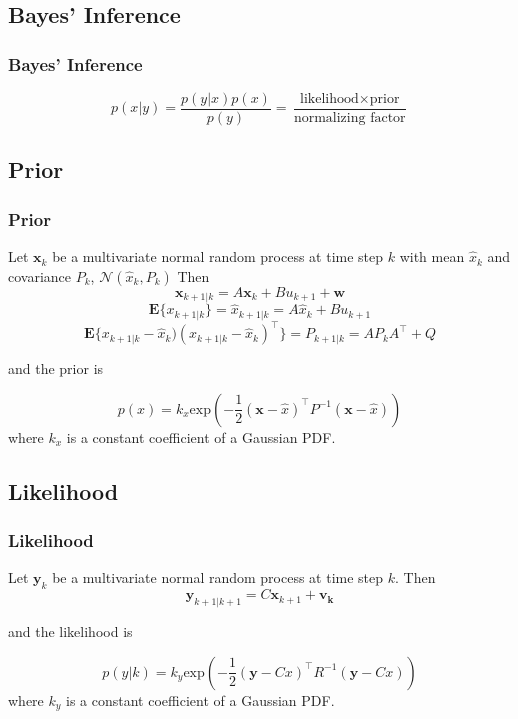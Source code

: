 \documentclass[10pt]{beamer}
\begin{document}

\subsection{Bayes' Inference}

\begin{frame}

  \frametitle{Bayes' Inference}

  $$p(x|y) = \frac{ p(y|x)p(x)}{p(y)} = \frac{\text{likelihood}\times \text{prior}}{\text{normalizing factor}} $$

\end{frame}



\subsection{Prior}

\begin{frame}

  \frametitle{Prior}

  Let $\mathbf{x}_k$ be a multivariate normal random process at time step $k$ with mean $\hat{x}_k$ and covariance $P_k$,  $\mathcal{N}(\hat{x}_k,P_k)$ Then
 $$\mathbf{x}_{k+1|k} = A\mathbf{x}_k + Bu_{k+1} + \mathbf{w}$$ 
 $$\textbf{E}\{x_{k+1|k}\} = \hat{x}_{k+1|k} =  A\hat{x}_k + Bu_{k+1}$$
 $$\textbf{E}\{x_{k+1|k} -\hat{x}_k)(x_{k+1|k} -\hat{x}_k)^\top \} = P_{k+1|k} = AP_kA^\top + Q $$ 

 and the prior is

 $$p(x) = k_x\text{exp}\left( -\frac{1}{2}(\mathbf{x} - \hat{x})^\top P^{-1}(\mathbf{x} - \hat{x})\right) $$   
 where $k_x$ is a constant coefficient of a Gaussian PDF.

\end{frame}



\subsection{Likelihood}

\begin{frame}

  \frametitle{Likelihood}

  Let $\mathbf{y}_k$ be a multivariate normal random process at time step $k$. Then
  $$\mathbf{y}_{k+1 | k+1} = C\mathbf{x}_{k+1} + \mathbf{v_k}$$

 and the likelihood is

 $$p(y|k) = k_y\text{exp}\left( -\frac{1}{2}(\mathbf{y} - Cx)^\top R^{-1}(\mathbf{y} - Cx)\right) $$   
 where $k_y$ is a constant coefficient of a Gaussian PDF.



\end{frame}
\end{document}
